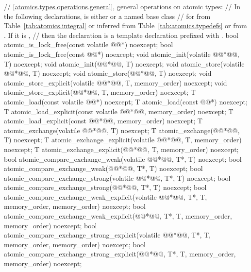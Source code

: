 \begin{codeblock}
{  // \ref{atomics.types.operations.general}, general operations on atomic types:
  // In the following declarations,  is either  or a named base class
  // for  from Table~\ref{tab:atomics.integral} or inferred from Table~\ref{tab:atomics.typedefs} or from . If it is ,
  // then the declaration is a template declaration prefixed with .
  bool atomic_is_lock_free(const volatile @@*) noexcept;
  bool atomic_is_lock_free(const @@*) noexcept;
  void atomic_init(volatile @@*@\itcorr[-1]@, T) noexcept;
  void atomic_init(@@*@\itcorr[-1]@, T) noexcept;
  void atomic_store(volatile @@*@\itcorr[-1]@, T) noexcept;
  void atomic_store(@@*@\itcorr[-1]@, T) noexcept;
  void atomic_store_explicit(volatile @@*@\itcorr[-1]@, T, memory_order) noexcept;
  void atomic_store_explicit(@@*@\itcorr[-1]@, T, memory_order) noexcept;
  T atomic_load(const volatile @@*) noexcept;
  T atomic_load(const @@*) noexcept;
  T atomic_load_explicit(const volatile @@*@\itcorr[-1]@, memory_order) noexcept;
  T atomic_load_explicit(const @@*@\itcorr[-1]@, memory_order) noexcept;
  T atomic_exchange(volatile @@*@\itcorr[-1]@, T) noexcept;
  T atomic_exchange(@@*@\itcorr[-1]@, T) noexcept;
  T atomic_exchange_explicit(volatile @@*@\itcorr[-1]@, T, memory_order) noexcept;
  T atomic_exchange_explicit(@@*@\itcorr[-1]@, T, memory_order) noexcept;
  bool atomic_compare_exchange_weak(volatile @@*@\itcorr[-1]@, T*, T) noexcept;
  bool atomic_compare_exchange_weak(@@*@\itcorr[-1]@, T*, T) noexcept;
  bool atomic_compare_exchange_strong(volatile @@*@\itcorr[-1]@, T*, T) noexcept;
  bool atomic_compare_exchange_strong(@@*@\itcorr[-1]@, T*, T) noexcept;
  bool atomic_compare_exchange_weak_explicit(volatile @@*@\itcorr[-1]@, T*, T, 
    memory_order, memory_order) noexcept;
  bool atomic_compare_exchange_weak_explicit(@@*@\itcorr[-1]@, T*, T,
    memory_order, memory_order) noexcept;
  bool atomic_compare_exchange_strong_explicit(volatile @@*@\itcorr[-1]@, T*, T,
    memory_order, memory_order) noexcept;
  bool atomic_compare_exchange_strong_explicit(@@*@\itcorr[-1]@, T*, T,
    memory_order, memory_order) noexcept;

}
\end{codeblock}
